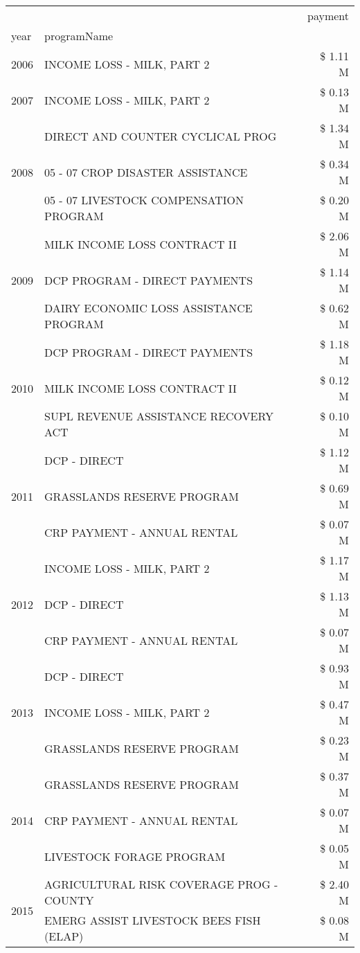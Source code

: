 \begin{tabular}{llr}
\toprule
 &  & payment \\
year & programName &  \\
\midrule
2006 & INCOME LOSS - MILK, PART 2 & \$ 1.11 M \\
\cline{1-3}
2007 & INCOME LOSS - MILK, PART 2 & \$ 0.13 M \\
\cline{1-3}
\multirow[t]{3}{*}{2008} & DIRECT AND COUNTER CYCLICAL PROG & \$ 1.34 M \\
 & 05 - 07 CROP DISASTER ASSISTANCE & \$ 0.34 M \\
 & 05 - 07 LIVESTOCK COMPENSATION PROGRAM & \$ 0.20 M \\
\cline{1-3}
\multirow[t]{3}{*}{2009} & MILK INCOME LOSS CONTRACT II & \$ 2.06 M \\
 & DCP PROGRAM - DIRECT PAYMENTS & \$ 1.14 M \\
 & DAIRY ECONOMIC LOSS ASSISTANCE PROGRAM & \$ 0.62 M \\
\cline{1-3}
\multirow[t]{3}{*}{2010} & DCP PROGRAM - DIRECT PAYMENTS & \$ 1.18 M \\
 & MILK INCOME LOSS CONTRACT II & \$ 0.12 M \\
 & SUPL REVENUE ASSISTANCE RECOVERY ACT & \$ 0.10 M \\
\cline{1-3}
\multirow[t]{3}{*}{2011} & DCP - DIRECT & \$ 1.12 M \\
 & GRASSLANDS RESERVE PROGRAM & \$ 0.69 M \\
 & CRP PAYMENT - ANNUAL RENTAL & \$ 0.07 M \\
\cline{1-3}
\multirow[t]{3}{*}{2012} & INCOME LOSS - MILK, PART 2 & \$ 1.17 M \\
 & DCP - DIRECT & \$ 1.13 M \\
 & CRP PAYMENT - ANNUAL RENTAL & \$ 0.07 M \\
\cline{1-3}
\multirow[t]{3}{*}{2013} & DCP - DIRECT & \$ 0.93 M \\
 & INCOME LOSS - MILK, PART 2 & \$ 0.47 M \\
 & GRASSLANDS RESERVE PROGRAM & \$ 0.23 M \\
\cline{1-3}
\multirow[t]{3}{*}{2014} & GRASSLANDS RESERVE PROGRAM & \$ 0.37 M \\
 & CRP PAYMENT - ANNUAL RENTAL & \$ 0.07 M \\
 & LIVESTOCK FORAGE PROGRAM & \$ 0.05 M \\
\cline{1-3}
\multirow[t]{3}{*}{2015} & AGRICULTURAL RISK COVERAGE PROG - COUNTY & \$ 2.40 M \\
 & EMERG ASSIST LIVESTOCK BEES FISH (ELAP) & \$ 0.08 M \\

\end{tabular}
